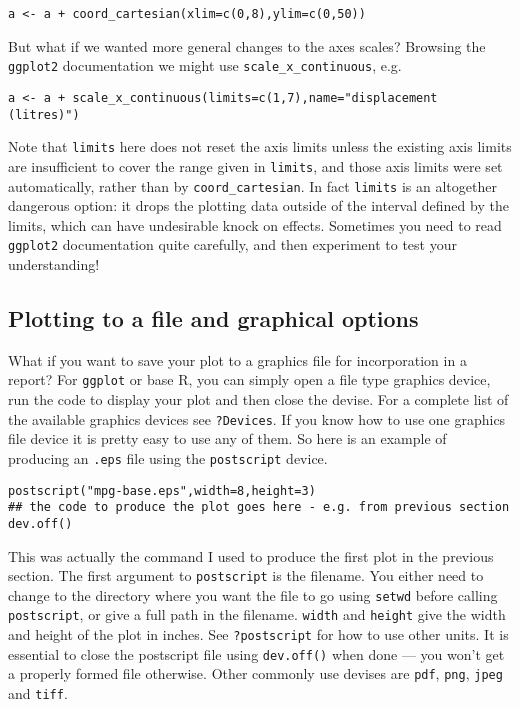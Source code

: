 \documentclass[10pt] {article}
\theoremstyle{definition}
\begin{document}
\begin{lstlisting}
a <- a + coord_cartesian(xlim=c(0,8),ylim=c(0,50))
\end{lstlisting} 
But what if we wanted more general changes to the axes scales? Browsing the {\tt ggplot2} documentation we might use \lstinline+scale_x_continuous+, e.g.
\begin{lstlisting}
a <- a + scale_x_continuous(limits=c(1,7),name="displacement (litres)")
\end{lstlisting} 
Note that {\tt limits} here does not reset the axis limits unless the existing axis limits are insufficient to cover the range given in {\tt limits}, and those axis limits were set automatically, rather than by \lstinline+coord_cartesian+. In fact {\tt limits} is an altogether dangerous option: it drops the plotting data outside of the interval defined by the limits, which can have undesirable knock on effects. Sometimes you need to read {\tt ggplot2} documentation quite carefully, and then experiment to test your understanding! 

\subsection{Plotting to a file and graphical options}

What if you want to save your plot to a graphics file for incorporation in a report? For {\tt ggplot} or base R, you can simply open a file type graphics device, run the code to display your plot and then close the devise. For a complete list of the available graphics devices see {\tt ?Devices}. If you know how to use one graphics file device it is pretty easy to use any of them. So here is an example of producing an {\tt .eps} file using the {\tt postscript} device. 
\begin{lstlisting}
postscript("mpg-base.eps",width=8,height=3)
## the code to produce the plot goes here - e.g. from previous section
dev.off()
\end{lstlisting}
This was actually the command I used to produce the first plot in the previous section. The first argument to {\tt postscript} is the filename. You either need to change to the directory where you want the file to go using \lstinline+setwd+ before calling \lstinline+postscript+, or give a full path in the filename. {\tt width} and {\tt height} give the width and height of the plot in inches. See {\tt ?postscript} for how to use other units. It is essential to close the postscript file using \lstinline+dev.off()+ when done --- you won't get a properly formed file otherwise. Other commonly use devises are {\tt pdf}, {\tt png}, {\tt jpeg} and {\tt tiff}.  
\end{document}
